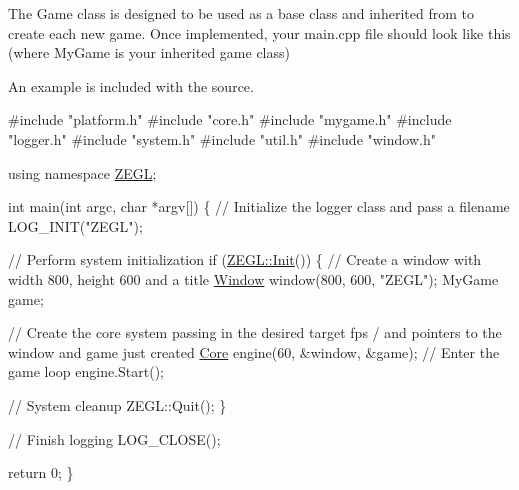 The {\ttfamily Game} class is designed to be used as a base class and inherited from to create each new game. Once implemented, your main.\+cpp file should look like this (where {\ttfamily My\+Game} is your inherited game class)

An example is included with the source.


\begin{DoxyCode}
\textcolor{preprocessor}{#include "platform.h"}
\textcolor{preprocessor}{#include "core.h"}
\textcolor{preprocessor}{#include "mygame.h"}
\textcolor{preprocessor}{#include "logger.h"}
\textcolor{preprocessor}{#include "system.h"}
\textcolor{preprocessor}{#include "util.h"}
\textcolor{preprocessor}{#include "window.h"}

\textcolor{keyword}{using namespace }\hyperlink{namespace_z_e_g_l}{ZEGL};

\textcolor{keywordtype}{int} main(\textcolor{keywordtype}{int} argc, \textcolor{keywordtype}{char} *argv[])
\{
  \textcolor{comment}{// Initialize the logger class and pass a filename}
  LOG\_INIT(\textcolor{stringliteral}{"ZEGL"});

  \textcolor{comment}{// Perform system initialization}
  \textcolor{keywordflow}{if} (\hyperlink{namespace_z_e_g_l_a2532f9e624be5cdf7898893a8ed3beb5}{ZEGL::Init}())
  \{
    \textcolor{comment}{// Create a window with width 800, height 600 and a title}
    \hyperlink{class_z_e_g_l_1_1_window}{Window} window(800, 600, \textcolor{stringliteral}{"ZEGL"});
    MyGame game;

    \textcolor{comment}{// Create the core system passing in the desired target fps}
    / and pointers to the window and game just created
    \hyperlink{class_z_e_g_l_1_1_core}{Core} engine(60, &window, &game);
    \textcolor{comment}{// Enter the game loop}
    engine.Start();

    \textcolor{comment}{// System cleanup}
    ZEGL::Quit();
  \}

  \textcolor{comment}{// Finish logging}
  LOG\_CLOSE();

  \textcolor{keywordflow}{return} 0;
\}
\end{DoxyCode}
 